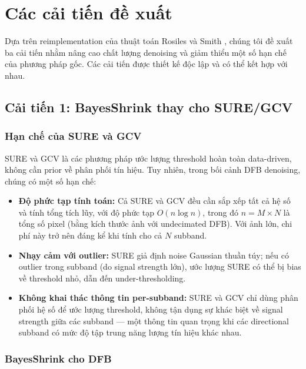 \section{Các cải tiến đề xuất}
\label{sec:improvements}

Dựa trên reimplementation của thuật toán Rosiles và Smith \cite{rosiles2000}, chúng tôi đề xuất ba cải tiến nhằm nâng cao chất lượng denoising và giảm thiểu một số hạn chế của phương pháp gốc. Các cải tiến được thiết kế độc lập và có thể kết hợp với nhau.

\subsection{Cải tiến 1: BayesShrink thay cho SURE/GCV}
\label{subsec:improve_bayes}

\subsubsection{Hạn chế của SURE và GCV}

SURE và GCV là các phương pháp ước lượng threshold hoàn toàn data-driven, không cần prior về phân phối tín hiệu. Tuy nhiên, trong bối cảnh DFB denoising, chúng có một số hạn chế:

\begin{itemize}
    \item \textbf{Độ phức tạp tính toán:} Cả SURE và GCV đều cần sắp xếp tất cả hệ số và tính tổng tích lũy, với độ phức tạp $O(n \log n)$, trong đó $n = M \times N$ là tổng số pixel (bằng kích thước ảnh với undecimated DFB). Với ảnh lớn, chi phí này trở nên đáng kể khi tính cho cả $N$ subband.

    \item \textbf{Nhạy cảm với outlier:} SURE giả định noise Gaussian thuần túy; nếu có outlier trong subband (do signal strength lớn), ước lượng SURE có thể bị bias về threshold nhỏ, dẫn đến under-thresholding.

    \item \textbf{Không khai thác thông tin per-subband:} SURE và GCV chỉ dùng phân phối hệ số để ước lượng threshold, không tận dụng sự khác biệt về signal strength giữa các subband --- một thông tin quan trọng khi các directional subband có mức độ tập trung năng lượng tín hiệu khác nhau.
\end{itemize}

\subsubsection{BayesShrink cho DFB}

